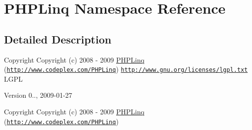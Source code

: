 \hypertarget{namespace_p_h_p_linq}{\section{\-P\-H\-P\-Linq \-Namespace \-Reference}
\label{namespace_p_h_p_linq}
}


\subsection{\-Detailed \-Description}
\begin{DoxyCopyright}{\-Copyright}
\-Copyright (c) 2008 -\/ 2009 \hyperlink{namespace_p_h_p_linq}{\-P\-H\-P\-Linq} (\href{http://www.codeplex.com/PHPLinq}{\tt http\-://www.\-codeplex.\-com/\-P\-H\-P\-Linq})  \href{http://www.gnu.org/licenses/lgpl.txt}{\tt http\-://www.\-gnu.\-org/licenses/lgpl.\-txt} \-L\-G\-P\-L 
\end{DoxyCopyright}
\begin{DoxyVersion}{\-Version}
0.., 2009-\/01-\/27
\end{DoxyVersion}
\begin{DoxyCopyright}{\-Copyright}
\-Copyright (c) 2008 -\/ 2009 \hyperlink{namespace_p_h_p_linq}{\-P\-H\-P\-Linq} (\href{http://www.codeplex.com/PHPLinq}{\tt http\-://www.\-codeplex.\-com/\-P\-H\-P\-Linq}) 
\end{DoxyCopyright}
